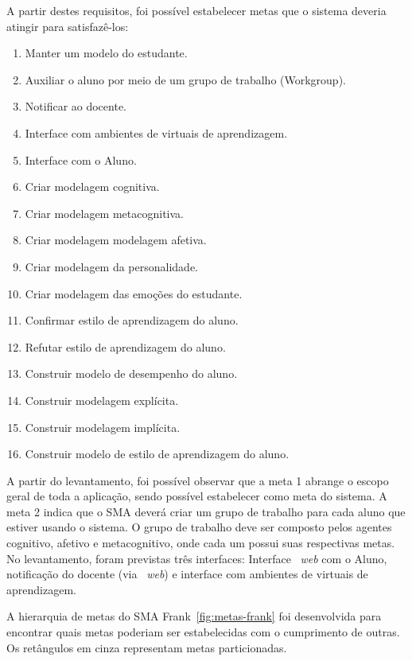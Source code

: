 A partir destes requisitos, foi possível estabelecer metas que o sistema deveria atingir para satisfazê-los:

\begin{enumerate}
	\item Manter um modelo do estudante.
	\item Auxiliar o aluno por meio de um grupo de trabalho (Workgroup).
	\item Notificar ao docente.
	\item Interface com ambientes de virtuais de aprendizagem.
	\item Interface com o Aluno.
	\item Criar modelagem cognitiva.
	\item Criar modelagem metacognitiva.
	\item Criar modelagem modelagem afetiva.
	\item Criar modelagem da personalidade.
	\item Criar modelagem das emoções do estudante.
	\item Confirmar estilo de aprendizagem do aluno.
	\item Refutar estilo de aprendizagem do aluno.
	\item Construir modelo de desempenho do aluno.
	\item Construir modelagem explícita.
	\item Construir modelagem implícita.
	\item Construir modelo de estilo de aprendizagem do aluno.
\end{enumerate}

A partir do levantamento, foi possível observar que a meta 1 abrange o escopo geral de toda a aplicação, sendo possível estabelecer como meta do sistema. A meta 2 indica que o SMA deverá criar um grupo de trabalho para cada aluno que estiver usando o sistema. O grupo de trabalho deve ser composto pelos agentes cognitivo, afetivo e metacognitivo, onde cada um possui suas respectivas metas. No levantamento, foram previstas três interfaces: Interface ~\emph{web} com o Aluno, notificação do docente (via ~\emph{web}) e interface com ambientes de virtuais de aprendizagem.

A hierarquia de metas do SMA Frank~\ref{fig:metas-frank} foi desenvolvida para encontrar quais metas poderiam ser estabelecidas com o cumprimento de outras. Os retângulos em cinza representam metas particionadas.

